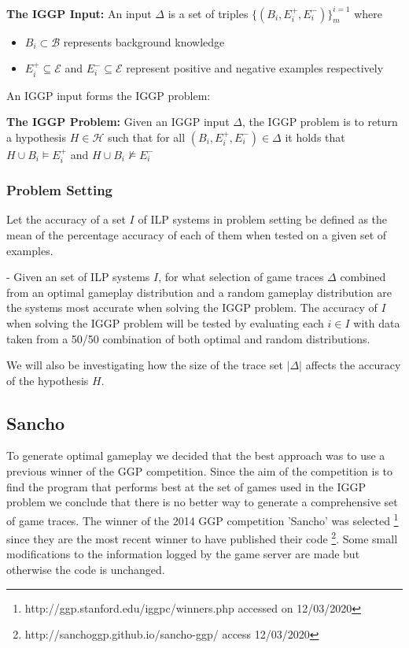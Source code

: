 \documentclass[a4paper,12pt]{report}
\begin{document}
\textbf{The IGGP Input:} An input $\Delta$ is a set of triples $\{(B_i,E_i^+,E_i^-)\}_m^{i=1}$ where
\begin{itemize}
\item $B_i \subset \mathcal{B}$ represents background knowledge
\item $E_i^+ \subseteq \mathscr{E}$ and $E_i^- \subseteq \mathscr{E}$ represent positive and negative examples respectively
\end{itemize}
An IGGP input forms the IGGP problem:

\textbf{The IGGP Problem:} Given an IGGP input $\Delta$, the IGGP problem is to return a hypothesis $H \in \mathscr{H}$ such that for all $(B_i,E_i^+,E_i^-) \in \Delta$ it holds that $H \cup B_i \vDash E_i^+$ and
$H \cup B_i \nvDash E_i^−$


\subsubsection{Problem Setting}
Let the accuracy of a set $I$ of ILP systems in problem setting be defined as the mean of the percentage accuracy of each of them when tested on a given set of examples.

- Given an set of ILP systems $I$, for what selection of game traces $\Delta$ combined from an optimal gameplay distribution and a random gameplay distribution are the systems most accurate when solving the IGGP problem. The accuracy of $I$ when solving the IGGP problem will be tested by evaluating each $i \in I$ with data taken from a 50/50 combination of both optimal and random distributions.

We will also be investigating how the size of the trace set $|\Delta|$ affects the accuracy of the hypothesis $H$.

\subsection{Sancho}
To generate optimal gameplay we decided that the best approach was to use a previous winner of the GGP competition. Since the aim of the competition is to find the program that performs best at the set of games used in the IGGP problem we conclude that there is no better way to generate a comprehensive set of game traces. The winner of the 2014 GGP competition 'Sancho' was selected \footnote{http://ggp.stanford.edu/iggpc/winners.php accessed on 12/03/2020} since they are the most recent winner to have published their code \footnote{http://sanchoggp.github.io/sancho-ggp/ access 12/03/2020}. Some small modifications to the information logged by the game server are made but otherwise the code is unchanged.
\end{document}
